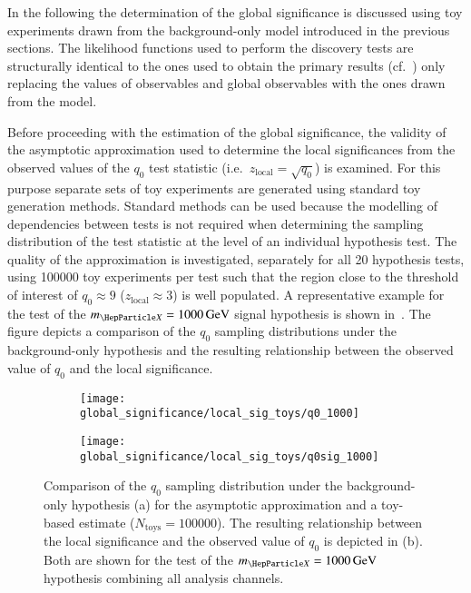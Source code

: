In the following the determination of the global significance is
discussed using toy experiments drawn from the background-only model
introduced in the previous sections. The likelihood functions used to
perform the discovery tests are structurally identical to the ones
used to obtain the primary results (cf.\
) only replacing the values of
observables and global observables with the ones drawn from the model.

Before proceeding with the estimation of the global significance, the
validity of the asymptotic approximation used to determine the local
significances from the observed values of the $q_0$ test statistic
(i.e.\ $z_{\text{local}} = \sqrt{q_0}$) is examined. For this purpose
separate sets of toy experiments are generated using standard toy
generation methods. Standard methods can be used because the modelling
of dependencies between tests is not required when determining the
sampling distribution of the test statistic at the level of an
individual hypothesis test. The quality of the approximation is
investigated, separately for all 20 hypothesis tests, using
\num{100000} toy experiments per test such that the region close to
the threshold of interest of $q_0 \approx 9$
($z_{\text{local}} \approx 3$) is well populated. A representative
example for the test of the $\mX = \SI{1000}{\GeV}$ signal hypothesis
is shown in~\Cref{fig:q0_samplingdist}. The figure depicts a
comparison of the $q_0$ sampling distributions under the
background-only hypothesis and the resulting relationship between the
observed value of $q_0$ and the local significance.

\begin{figure}[htbp]
  \centering

  \begin{subfigure}{0.485\textwidth}
    \centering

    \texttt{[image: global\_significance/local\_sig\_toys/q0\_1000]}
    \subcaption{}
  \end{subfigure}\hfill%
  \begin{subfigure}{0.485\textwidth}
    \centering
    \texttt{[image: global\_significance/local\_sig\_toys/q0sig\_1000]}
    \subcaption{}%
    \label{fig:q0_samplingdist_q0sig}
  \end{subfigure}

  \caption{Comparison of the $q_0$ sampling distribution under the
    background-only hypothesis (a) for the asymptotic approximation
    and a toy-based estimate ($N_{\text{toys}} = \num{100000}$). The
    resulting relationship between the local significance and the
    observed value of $q_0$ is depicted in (b). Both are shown for the
    test of the $\mX = \SI{1000}{\GeV}$ hypothesis combining all
    analysis channels.}%
  \label{fig:q0_samplingdist}
\end{figure}

